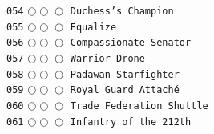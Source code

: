 \documentclass[a4paper,landscape]{article}
\begin{document}
\begin{multicols*}{5}
\texttt{054} \(\bigcirc\!\bigcirc\!\bigcirc\)  \texttt{Duchess's Champion} \vspace{-0.3mm}\\ 
\texttt{055} \(\bigcirc\!\bigcirc\!\bigcirc\)  \texttt{Equalize} \vspace{-0.3mm}\\ 
\texttt{056} \(\bigcirc\!\bigcirc\!\bigcirc\)  \texttt{Compassionate Senator} \vspace{-0.3mm}\\ 
\texttt{057} \(\bigcirc\!\bigcirc\!\bigcirc\)  \texttt{Warrior Drone} \vspace{-0.3mm}\\ 
\texttt{058} \(\bigcirc\!\bigcirc\!\bigcirc\)  \texttt{Padawan Starfighter} \vspace{-0.3mm}\\ 
\texttt{059} \(\bigcirc\!\bigcirc\!\bigcirc\)  \texttt{Royal Guard Attaché} \vspace{-0.3mm}\\ 
\texttt{060} \(\bigcirc\!\bigcirc\!\bigcirc\)  \texttt{Trade Federation Shuttle} \vspace{-0.3mm}\\ 
\texttt{061} \(\bigcirc\!\bigcirc\!\bigcirc\)  \texttt{Infantry of the 212th} \vspace{-0.3mm}\\ 

\end{multicols*}
\end{document}

